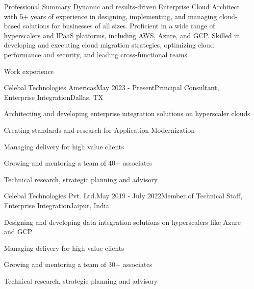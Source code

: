 \documentclass{resume} %
\begin{document}
	
	
	
	\begin{rSection}{Professional Summary}
		{Dynamic and results-driven Enterprise Cloud Architect with 5+ years of experience in designing, implementing, and managing cloud-based solutions for businesses of all sizes. Proficient in a wide range of hyperscalers and IPaaS platforms, including AWS, Azure, and GCP. Skilled in developing and executing cloud migration strategies, optimizing cloud performance and security, and leading cross-functional teams.}
	\end{rSection}
	
	
	\begin{rSection}{Work experience}
		
		\begin{rSubsection}{Celebal Technologies Americas}{May 2023 - Present}{Principal Consultant, Enterprise Integration}{Dallas, TX}
			\item Architecting and developing enterprise integration solutions on hyperscaler clouds
			\item Creating standards and research for Application Modernization
			\item Managing delivery for high value clients
			\item Growing and mentoring a team of 40+ associates
			\item Technical research, strategic planning and advisory
		\end{rSubsection}
		
		\begin{rSubsection}{Celebal Technologies Pvt. Ltd.}{May 2019 - July 2022}{Member of Technical Staff, Enterprise Integration}{Jaipur, India}
			\item Designing and developing data integration solutions on hyperscalers like Azure and GCP
			\item Managing delivery for high value clients
			\item Growing and mentoring a team of 30+ associates
			\item Technical research, strategic planning and advisory
		\end{rSubsection}
		
		
	\end{rSection}
	
\end{document}
